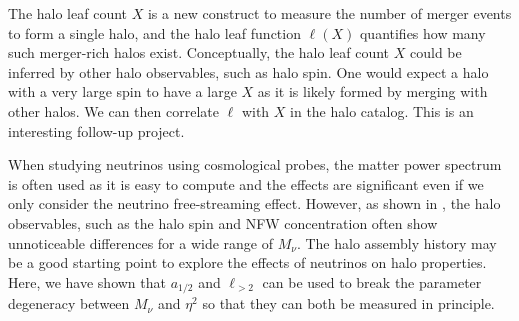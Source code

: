 The halo leaf count $X$ is a new construct to measure the number of merger events to form a single halo, and the halo leaf function $\ell(X)$ quantifies how many such merger-rich halos exist. Conceptually, the halo leaf count $X$ could be inferred by other halo observables, such as halo spin. One would expect a halo with a very large spin to have a large $X$ as it is likely formed by merging with other halos. We can then correlate $\ell$ with $X$ in the halo catalog. This is an interesting follow-up project.

When studying neutrinos using cosmological probes, the matter power spectrum is often used \cite{Carton, Yvvone, Yvvone fluid, nuconcept} as it is easy to compute and the effects are significant even if we only consider the neutrino free-streaming effect. 
However, as shown in \cite{halo bias}, the halo observables, such as the halo spin and NFW concentration often show unnoticeable differences for a wide range of $M_\nu$. 
The halo assembly history may be a good starting point to explore the effects of neutrinos on halo properties.
Here, we have shown that $a_{1/2}$ and $\ell_{>2}$ can be used to break the parameter degeneracy between $M_\nu$ and $\eta^2$ so that they can both be measured in principle.